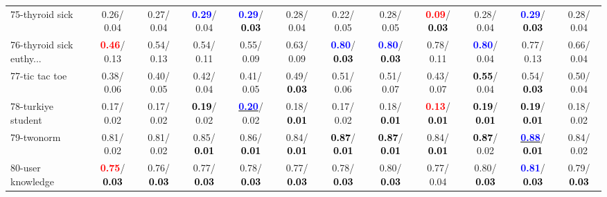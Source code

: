 \begin{table}[h]
\begin{center}
{\begin{tabular}{lc|c|c|c|c|c|c|c|c|c|c}
75-thyroid sick &   0.26/  0.04 &   0.27/  0.04 & \textcolor{blue}{\textbf{  0.29}}/  0.04 & \textcolor{blue}{\textbf{  0.29}}/\textcolor{black}{\textbf{  0.03}} &   0.28/  0.04 &   0.22/  0.05 &   0.28/  0.05 & \textcolor{red}{\textbf{  0.09}}/\textcolor{black}{\textbf{  0.03}} &   0.28/  0.04 & \textcolor{blue}{\textbf{  0.29}}/\textcolor{black}{\textbf{  0.03}} &   0.28/  0.04 \\
76-thyroid sick euthy... & \textcolor{red}{\textbf{  0.46}}/  0.13 &   0.54/  0.13 &   0.54/  0.11 &   0.55/  0.09 &   0.63/  0.09 & \textcolor{blue}{\textbf{  0.80}}/\textcolor{black}{\textbf{  0.03}} & \textcolor{blue}{\textbf{  0.80}}/\textcolor{black}{\textbf{  0.03}} &   0.78/  0.11 & \textcolor{blue}{\textbf{  0.80}}/  0.04 &   0.77/  0.13 &   0.66/  0.04 \\
77-tic tac toe &   0.38/  0.06 &   0.40/  0.05 &   0.42/  0.04 &   0.41/  0.05 &   0.49/\textcolor{black}{\textbf{  0.03}} &   0.51/  0.06 &   0.51/  0.07 &   0.43/  0.07 & \textcolor{black}{\textbf{  0.55}}/  0.04 &   0.54/\textcolor{black}{\textbf{  0.03}} &   0.50/  0.04 \\
78-turkiye student &   0.17/  0.02 &   0.17/  0.02 & \textcolor{black}{\textbf{  0.19}}/  0.02 & \underline{\textcolor{blue}{\textbf{  0.20}}}/  0.02 &   0.18/\textcolor{black}{\textbf{  0.01}} &   0.17/  0.02 &   0.18/\textcolor{black}{\textbf{  0.01}} & \textcolor{red}{\textbf{  0.13}}/\textcolor{black}{\textbf{  0.01}} & \textcolor{black}{\textbf{  0.19}}/\textcolor{black}{\textbf{  0.01}} & \textcolor{black}{\textbf{  0.19}}/\textcolor{black}{\textbf{  0.01}} &   0.18/  0.02 \\ \hline
79-twonorm &   0.81/  0.02 &   0.81/  0.02 &   0.85/\textcolor{black}{\textbf{  0.01}} &   0.86/\textcolor{black}{\textbf{  0.01}} &   0.84/\textcolor{black}{\textbf{  0.01}} & \textcolor{black}{\textbf{  0.87}}/\textcolor{black}{\textbf{  0.01}} & \textcolor{black}{\textbf{  0.87}}/\textcolor{black}{\textbf{  0.01}} &   0.84/\textcolor{black}{\textbf{  0.01}} & \textcolor{black}{\textbf{  0.87}}/  0.02 & \underline{\textcolor{blue}{\textbf{  0.88}}}/\textcolor{black}{\textbf{  0.01}} &   0.84/  0.02 \\
80-user knowledge & \textcolor{red}{\textbf{  0.75}}/\textcolor{black}{\textbf{  0.03}} &   0.76/\textcolor{black}{\textbf{  0.03}} &   0.77/\textcolor{black}{\textbf{  0.03}} &   0.78/\textcolor{black}{\textbf{  0.03}} &   0.77/\textcolor{black}{\textbf{  0.03}} &   0.78/\textcolor{black}{\textbf{  0.03}} &   0.80/\textcolor{black}{\textbf{  0.03}} &   0.77/  0.04 &   0.80/\textcolor{black}{\textbf{  0.03}} & \textcolor{blue}{\textbf{  0.81}}/\textcolor{black}{\textbf{  0.03}} &   0.79/\textcolor{black}{\textbf{  0.03}} \\

\end{tabular}}
\end{center}
\end{table}
